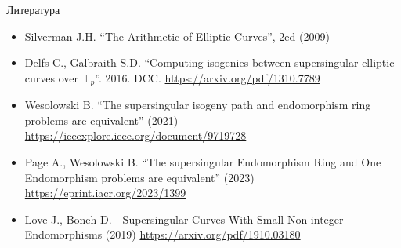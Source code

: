 \documentclass{beamer}
\begin{document}
\begin{frame}{Литература}
	\begin{scriptsize}
	\begin{itemize}
		\item[\structure{{\faBook}}] Silverman J.H. ``The Arithmetic of Elliptic Curves'', 2ed (2009)
		\vspace{0.5em}

		\item[\structure{{\faScroll}}] Delfs C., Galbraith S.D. ``Computing isogenies between supersingular elliptic curves over~$\mathbb{F}_p$''. 2016. DCC. \url{https://arxiv.org/pdf/1310.7789}
		\vspace{0.5em}
		
		\item[\structure{{\faScroll}}] Wesolowski B. ``The supersingular isogeny path and endomorphism ring problems are equivalent'' (2021)
		\url{https://ieeexplore.ieee.org/document/9719728}
		\vspace{0.5em}
		
		\item[\structure{{\faScroll}}] Page A., Wesolowski B. ``The supersingular Endomorphism Ring and One Endomorphism problems are equivalent'' (2023)
		\url{https://eprint.iacr.org/2023/1399}
		
		\item[\structure{\faScroll}] Love J., Boneh D. - Supersingular Curves With Small Non-integer Endomorphisms (2019)
		\url{https://arxiv.org/pdf/1910.03180}

%
	\end{itemize}
	\end{scriptsize}
	


\end{frame}
\end{document}
